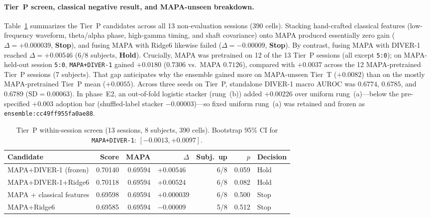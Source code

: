 \documentclass[11pt]{article}
\begin{document}
\paragraph{Tier~P screen, classical negative result, and MAPA-unseen breakdown.}
Table~\ref{tab:tierp} summarizes the Tier~P candidates across all 13 non-evaluation sessions (390 cells). Stacking hand-crafted classical features (low-frequency waveform, theta/alpha phase, high-gamma timing, and shaft covariance) onto MAPA produced essentially zero gain ($\Delta=+0.000039$, \textbf{Stop}), and fusing MAPA with Ridge6 likewise failed ($\Delta=-0.00009$, \textbf{Stop}). By contrast, fusing MAPA with DIVER-1 reached $\Delta=+0.00546$ ($6/8$ subjects, \textbf{Hold}). Crucially, MAPA was pretrained on 12 of the 13 Tier~P sessions (all except \texttt{5:0}); on MAPA-held-out session \texttt{5:0}, \texttt{MAPA+DIVER-1} gained $+0.0180$ ($0.7306$ vs.\ MAPA $0.7126$), compared with $+0.0037$ across the 12 MAPA-pretrained Tier~P sessions (7 subjects). That gap anticipates why the ensemble gained more on MAPA-unseen Tier~T ($+0.0082$) than on the mostly MAPA-pretrained Tier~P mean ($+0.0055$). Across three seeds on Tier~P, standalone DIVER-1 macro AUROC was $0.6774$, $0.6785$, and $0.6789$ ($\text{SD}=0.00063$). In phase~E2, an out-of-fold logistic stacker (rung~(b)) added $+0.00226$ over uniform rung~(a)---below the pre-specified $+0.003$ adoption bar (shuffled-label stacker $-0.00003$)---so fixed uniform rung~(a) was retained and frozen as \texttt{ensemble:cc49ff955fa0ae88}.

\begin{table}[htbp]\centering\small
\begin{tabular}{lrrrrrl}\toprule
Candidate & Score & MAPA & $\Delta$ & Subj.\ up & $p$ & Decision\\\midrule
MAPA+DIVER-1 (frozen) & 0.70140 & 0.69594 & $+0.00546\phantom{0}$ & 6/8 & 0.059 & Hold\\
MAPA+DIVER-1+Ridge6 & 0.70118 & 0.69594 & $+0.00524\phantom{0}$ & 6/8 & 0.082 & Hold\\
MAPA + classical features & 0.69598 & 0.69594 & $+0.000039$ & 6/8 & 0.500 & Stop\\
MAPA+Ridge6 & 0.69585 & 0.69594 & $-0.00009\phantom{0}$ & 5/8 & 0.512 & Stop\\\bottomrule
\end{tabular}
\caption{Tier~P within-session screen (13 sessions, 8 subjects, 390 cells). Bootstrap 95\% CI for \texttt{MAPA+DIVER-1}: $[-0.0013,+0.0097]$.}
\label{tab:tierp}
\end{table}
\end{document}
